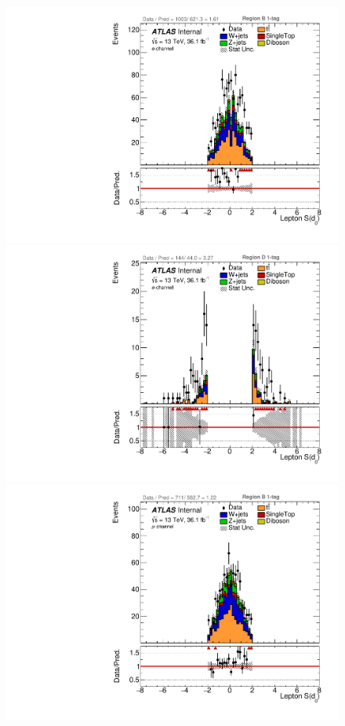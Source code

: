 \begin{figure}[!htbp]
\begin{center}
\includegraphics[scale=0.33]{./figures/boosted/ABCD/elec_Inc_RegionB_Lep_d0sigL}
\includegraphics[scale=0.33]{./figures/boosted/ABCD/elec_Inc_RegionD_Lep_d0sigL}\\
\includegraphics[scale=0.33]{./figures/boosted/ABCD/muon_Inc_RegionB_Lep_d0sigL}

\end{center}
\end{figure}
